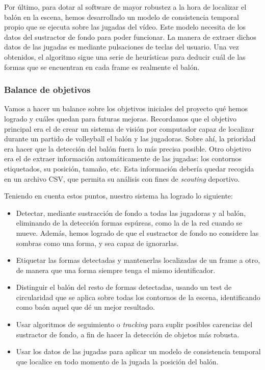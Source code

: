 Por último, para dotar al software de mayor robustez a la hora de localizar el balón en la escena, hemos desarrollado un modelo de consistencia temporal propio que se ejecuta sobre las jugadas del vídeo. Este modelo necesita de los datos del sustractor de fondo para poder funcionar. La manera de extraer dichos datos de las jugadas es mediante pulsaciones de teclas del usuario. Una vez obtenidos, el algoritmo sigue una serie de heurísticas para deducir cuál de las formas que se encuentran en cada frame es realmente el balón.

\subsubsection*{Balance de objetivos}
Vamos a hacer un balance sobre los objetivos iniciales del proyecto qué hemos logrado y cuáles quedan para futuras mejoras. Recordamos que el objetivo principal era el de crear un sistema de visión por computador capaz de localizar durante un partido de volleyball el balón y las jugadoras. Sobre ahí, la prioridad era hacer que la detección del balón fuera lo más precisa posible. Otro objetivo era el de extraer información automáticamente de las jugadas: los contornos etiquetados, su posición, tamaño, etc. Esta información debería quedar recogida en un archivo CSV, que permita su análisis con fines de \textit{scouting} deportivo.

Teniendo en cuenta estos puntos, nuestro sistema ha logrado lo siguiente:
\begin{itemize}
    \item Detectar, mediante sustracción de fondo a todas las jugadoras y al balón, eliminando de la detección formas espúreas, como la de la red cuando se mueve. Además, hemos logrado de que el sustractor de fondo no considere las sombras como una forma, y sea capaz de ignorarlas.
    \item Etiquetar las formas detectadas y mantenerlas localizadas de un frame a otro, de manera que una forma siempre tenga el mismo identificador.
    \item Distinguir el balón del resto de formas detectadas, usando un test de circularidad que se aplica sobre todas los contornos de la escena, identificando como baón aquel que dé un mejor resultado.
    \item Usar algoritmos de seguimiento o \textit{tracking} para suplir posibles carencias del sustractor de fondo, a fin de hacer la detección de objetos más robusta.
    \item Usar los datos de las jugadas para aplicar un modelo de consistencia temporal que localice en todo momento de la jugada la posición del balón.
\end{itemize}

